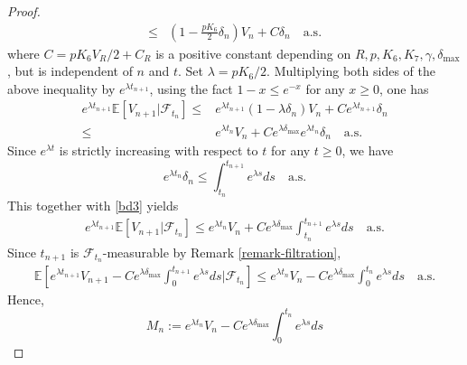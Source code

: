 \documentclass[preprint,12pt,compress]{elsarticle}
\begin{document}
\begin{proof}
\begin{equation}
\begin{split}
	\le& \left( {1 - \frac{{p{K_6}}}{2}{\delta _n}} \right)V_n + C{\delta _n}  \quad \text{a.s.}
\end{split}
\end{equation} 
where $C = pK_6 V_R/2 + C_R$ is a positive constant depending on $R, p, K_6, K_7, \gamma, \delta_{\max}$, but is independent of $n$ and $t$.
Set $\lambda = pK_6 /2$. Multiplying both sides of the above inequality by ${e^{\lambda {t_{n + 1}}}}$, using the fact $1 - x \le e^{-x}$ for any $x \ge 0 $, one has
\begin{equation}  \label{bd3}
	\begin{split}
		{e^{\lambda {t_{n + 1}}}}\mathbb{E}\left[ {{V_{n + 1}}|{\mathcal{F}_{{t_n}}}} \right] 
		\le& {e^{\lambda {t_{n + 1}}}}(1 - \lambda {\delta _n})V_n + C{e^{\lambda {t_{n + 1}}}}{\delta _n}  \\
		\le& {e^{\lambda {t_n}}}V_n + C{e^{\lambda {\delta _{\max }}}}{e^{\lambda {t_n}}}{\delta _n} \quad \text{a.s.}
	\end{split}
\end{equation}
Since ${e^{\lambda t}}$ is strictly increasing with respect to $t$ for any $t \ge 0$, we have
\begin{equation*}
	{e^{\lambda {t_n}}}{\delta _n} \le \int_{{t_n}}^{{t_{n + 1}}} {{e^{\lambda s}}ds}   \quad \text{a.s.}
\end{equation*}
This together with \eqref{bd3} yields
\begin{equation}  \label{bd4}
	\begin{split}
		{e^{\lambda {t_{n + 1}}}}\mathbb{E}\left[ {{V_{n + 1}}|{\mathcal{F}_{{t_n}}}} \right]
		\le {e^{\lambda {t_n}}}V_n + C{e^{\lambda {\delta _{\max }}}}\int_{{t_n}}^{{t_{n + 1}}} {{e^{\lambda s}}ds}   \quad  \text{a.s.}
	\end{split}
\end{equation}
Since $t_{n+1}$ is $\mathcal{F}_{t_n}$-measurable by Remark \ref{remark-filtration},
\begin{equation*}
\begin{split}
	\mathbb{E}\left[ {{e^{\lambda {t_{n + 1}}}}V_{n+1} - C{e^{\lambda {\delta _{\max }}}}\int_0^{{t_{n + 1}}} {{e^{\lambda s}}ds} |{\mathcal{F}_{{t_n}}}} \right] 
	\le {e^{\lambda {t_n}}}V_n - C{e^{\lambda {\delta _{\max }}}}\int_0^{{t_n}} {{e^{\lambda s}}ds}  \quad \text{a.s.}
\end{split}
\end{equation*}
Hence, 
\begin{equation*}
	{M_n} := {e^{\lambda {t_n}}}V_n - C{e^{\lambda {\delta _{\max }}}}\int_0^{{t_n}} {{e^{\lambda s}}ds} 

\end{equation*}
\end{proof}
\end{document}

